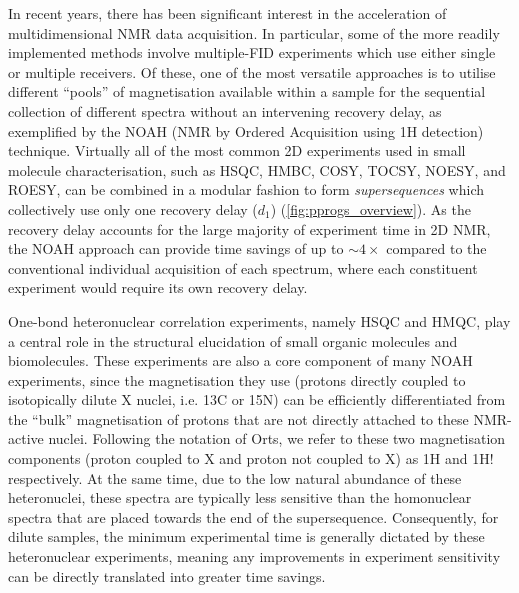 \documentclass[11pt]{article}
\newcommand*{\carbon}{13C}
\newcommand*{\proton}{1H}
\newcommand*{\nitrogen}{15N}
\newcommand*{\magn}[1]{1H#1}
\newcommand*{\magnnot}[1]{1H!#1}
\begin{document}
\begin{refsection}
In recent years, there has been significant interest in the acceleration of multidimensional NMR data acquisition.\autocite{reducedd1, ultrafast, timeshared, multireceive, other_multifid}
In particular, some of the more readily implemented methods involve multiple-FID experiments which use either single or multiple receivers.
Of these, one of the most versatile approaches is to utilise different ``pools'' of magnetisation available within a sample for the sequential collection of different spectra without an intervening recovery delay, as exemplified by the NOAH (NMR by Ordered Acquisition using \proton{} detection) technique.\autocite{noah}
Virtually all of the most common 2D experiments used in small molecule characterisation, such as HSQC, HMBC, COSY, TOCSY, NOESY, and ROESY, can be combined in a modular fashion to form \textit{supersequences} which collectively use only one recovery delay ($d_1$) (\cref{fig:pprogs_overview}).
As the recovery delay accounts for the large majority of experiment time in 2D NMR, the NOAH approach can provide time savings of up to $\sim 4\times$ compared to the conventional individual acquisition of each spectrum, where each constituent experiment would require its own recovery delay.

One-bond heteronuclear correlation experiments, namely HSQC and HMQC, play a central role in the structural elucidation of small organic molecules and biomolecules.\autocite{textbooks}
These experiments are also a core component of many NOAH experiments, since the magnetisation they use (protons directly coupled to isotopically dilute X nuclei, i.e. \carbon{} or \nitrogen{}) can be efficiently differentiated from the ``bulk'' magnetisation of protons that are not directly attached to these NMR-active nuclei.\autocite{isotopefilter}
Following the notation of Orts,\autocite{Orts2018M} we refer to these two magnetisation components (proton coupled to X and proton not coupled to X) as \magn{} and \magnnot{} respectively.
At the same time, due to the low natural abundance of these heteronuclei, these spectra are typically less sensitive than the homonuclear spectra that are placed towards the end of the supersequence.
Consequently, for dilute samples, the minimum experimental time is generally dictated by these heteronuclear experiments, meaning any improvements in experiment sensitivity can be directly translated into greater time savings.


\end{refsection}
\end{document}

